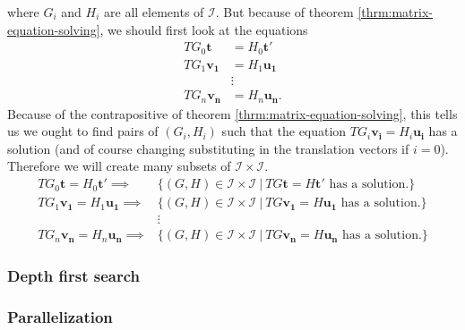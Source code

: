 \documentclass[a4paper,10pt]{article}
\theoremstyle{plain}
\theoremstyle{definition}
\theoremstyle{remark}
\renewcommand{\vec}[1]{\mathbf{#1}}
\begin{document}
where \( G_i \) and \( H_i \) are all elements of \( \mathcal{I} \).
But because of theorem \ref{thrm:matrix-equation-solving}, we should first look at the equations
\begin{align*}
	TG_0\vec{t} &= H_0\vec{t'} \\
	TG_1\vec{v_1} &= H_1\vec{u_1} \\
	&\vdots \\
	TG_n\vec{v_n} &= H_n\vec{u_n}.
\end{align*}
Because of the contrapositive of theorem \ref{thrm:matrix-equation-solving}, this tells us we ought to find pairs of \( (G_i, H_i) \) such that the equation \( TG_i\vec{v_i} = H_i\vec{u_i} \) has a solution (and of course changing substituting in the translation vectors if \( i = 0 \)).
Therefore we will create many subsets of \( \mathcal{I} \times \mathcal{I} \).
\begin{align*}
	TG_0\vec{t} = H_0\vec{t'} \implies& \{(G, H) \in \mathcal{I} \times \mathcal{I} \ |\ TG\vec{t} = H\vec{t'} \text{ has a solution.}\} \\
	TG_1\vec{v_1} = H_1\vec{u_1}  \implies& \{(G, H) \in \mathcal{I} \times \mathcal{I} \ |\ TG\vec{v_1} = H\vec{u_1} \text{ has a solution.}\} \\
	&\vdots \\
	TG_n\vec{v_n} = H_n\vec{u_n}  \implies& \{(G, H) \in \mathcal{I} \times \mathcal{I} \ |\ TG\vec{v_n} = H\vec{u_n} \text{ has a solution.}\}
\end{align*}
\subsubsection{Depth first search}
\subsubsection{Parallelization}
\end{document}
